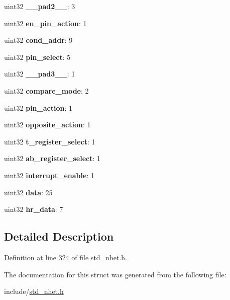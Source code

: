 \begin{DoxyCompactItemize}
uint32 {\bfseries \+\_\+\+\_\+pad2\+\_\+\+\_\+}\+: 3
\item 
\mbox{\label{structRADM64__format_ac90f992dd98fc12e74262bebf3fe469d}} 
uint32 {\bfseries en\+\_\+pin\+\_\+action}\+: 1
\item 
\mbox{\label{structRADM64__format_aa0e3b7a084f0853bb26cf949fcac5c03}} 
uint32 {\bfseries cond\+\_\+addr}\+: 9
\item 
\mbox{\label{structRADM64__format_adc3a1a3a3f09d7856887acd443024f40}} 
uint32 {\bfseries pin\+\_\+select}\+: 5
\item 
\mbox{\label{structRADM64__format_a41bc09d5f22abe4729b6f16488dac6a7}} 
uint32 {\bfseries \+\_\+\+\_\+pad3\+\_\+\+\_\+}\+: 1
\item 
\mbox{\label{structRADM64__format_a063dcd91d96c3e4419ba879e33680049}} 
uint32 {\bfseries compare\+\_\+mode}\+: 2
\item 
\mbox{\label{structRADM64__format_ae2a6c0bf81b743d30f69adabcc25e625}} 
uint32 {\bfseries pin\+\_\+action}\+: 1
\item 
\mbox{\label{structRADM64__format_a91085cc5f80af631bf1af9506eae9395}} 
uint32 {\bfseries opposite\+\_\+action}\+: 1
\item 
\mbox{\label{structRADM64__format_a5fba01616ad9e8ad7139e48bce8d3f15}} 
uint32 {\bfseries t\+\_\+register\+\_\+select}\+: 1
\item 
\mbox{\label{structRADM64__format_a820f5176cc0561fb706ac850b4792d23}} 
uint32 {\bfseries ab\+\_\+register\+\_\+select}\+: 1
\item 
\mbox{\label{structRADM64__format_ad41887f31a6697dfb15c1ceb09560b47}} 
uint32 {\bfseries interrupt\+\_\+enable}\+: 1
\item 
\mbox{\label{structRADM64__format_a73d3ead98b029970a563ac3391902a6b}} 
uint32 {\bfseries data}\+: 25
\item 
\mbox{\label{structRADM64__format_a4931a78ed8dd1748ea28453e5fdb4244}} 
uint32 {\bfseries hr\+\_\+data}\+: 7
\end{DoxyCompactItemize}


\subsection{Detailed Description}


Definition at line 324 of file std\+\_\+nhet.\+h.



The documentation for this struct was generated from the following file\+:\begin{DoxyCompactItemize}
\item 
include/\mbox{\hyperlink{std__nhet_8h}{std\+\_\+nhet.\+h}}\end{DoxyCompactItemize}
